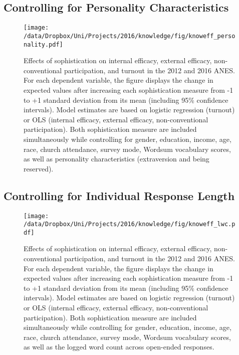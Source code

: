 \subsection{Controlling for Personality Characteristics}
\begin{figure}[h]\centering
\texttt{[image: /data/Dropbox/Uni/Projects/2016/knowledge/fig/knoweff\_personality.pdf]}
\caption[Effects of sophistication on internal efficacy, external efficacy, non-conventional participation, and turnout in the 2012 and 2016 ANES]{Effects of sophistication on internal efficacy, external efficacy, non-conventional participation, and turnout in the 2012 and 2016 ANES. For each dependent variable, the figure displays the change in expected values after increasing each sophistication measure from -1 to +1 standard deviation from its mean (including 95\% confidence intervals). Model estimates are based on logistic regression (turnout) or OLS (internal efficacy, external efficacy, non-conventional participation). Both sophistication measure are included simultaneously while controlling for gender, education, income, age, race, church attendance, survey mode, Wordsum vocabulary scores, as well as personality characteristics (extraversion and being reserved).
}\label{fig:knoweff_personality}
\end{figure}

\clearpage
\subsection{Controlling for Individual Response Length}
\begin{figure}[h]\centering
\texttt{[image: /data/Dropbox/Uni/Projects/2016/knowledge/fig/knoweff\_lwc.pdf]}
\caption[Effects of sophistication on internal efficacy, external efficacy, non-conventional participation, and turnout in the 2012 and 2016 ANES]{Effects of sophistication on internal efficacy, external efficacy, non-conventional participation, and turnout in the 2012 and 2016 ANES. For each dependent variable, the figure displays the change in expected values after increasing each sophistication measure from -1 to +1 standard deviation from its mean (including 95\% confidence intervals). Model estimates are based on logistic regression (turnout) or OLS (internal efficacy, external efficacy, non-conventional participation). Both sophistication measure are included simultaneously while controlling for gender, education, income, age, race, church attendance, survey mode, Wordsum vocabulary scores, as well as the logged word count across open-ended responses.
}\label{fig:knoweff_lwc}
\end{figure}


